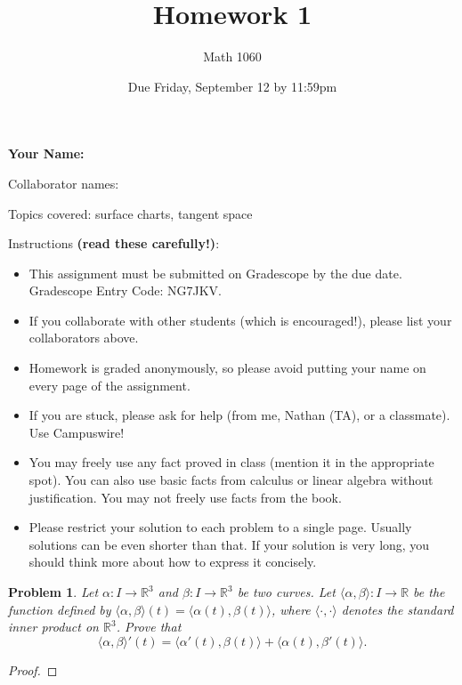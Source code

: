 \documentclass[11pt]{article}
\author{Math 1060}
\date{Due Friday, September 12 by 11:59pm}
\title{Homework 1}
\newtheorem{problem}{Problem}
\begin{document}
\maketitle


{\bf\Large Your Name:} 

Collaborator names: 


\vspace{.3in}
Topics covered: surface charts, tangent space

Instructions {\bf (read these carefully!)}: 
\begin{itemize}
\item This assignment must be submitted on Gradescope by the due date. Gradescope Entry Code: NG7JKV. 
\item If you collaborate with other students (which is encouraged!), please list your collaborators above. 
\item Homework is graded anonymously, so please avoid putting your name on every page of the assignment.
\item If you are stuck, please ask for help (from me, Nathan (TA), or a classmate). Use Campuswire!  
\item You may freely use any fact proved in class (mention it in the appropriate spot). You can also use basic facts from calculus or linear algebra without justification. You may not freely use facts from the book. 
\item Please restrict your solution to each problem to a single page. Usually solutions can be even shorter than that. If your solution is very long, you should think more about how to express it concisely.
\end{itemize}
\pagebreak 

\begin{problem}
Let $\alpha:I\to\mathbb R^3$ and $\beta:I\to\mathbb R^3$ be two curves. Let $\langle\alpha,\beta\rangle:I\to\mathbb R$ be the function defined by $\langle\alpha,\beta\rangle(t)=\langle\alpha(t),\beta(t)\rangle$, where $\langle\cdot,\cdot\rangle$ denotes the standard inner product on $\mathbb R^3$. Prove that 
\[\langle\alpha,\beta\rangle'(t)=\langle \alpha'(t),\beta(t)\rangle+\langle\alpha(t),\beta'(t)\rangle.\]
\end{problem}

\begin{proof}

\end{proof}

\pagebreak
\end{document}
